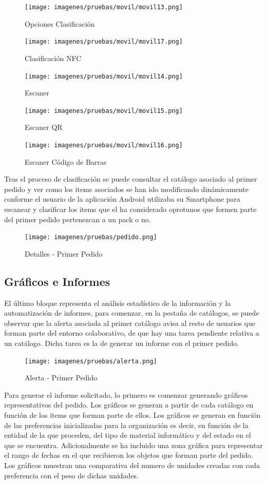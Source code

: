 \documentclass[a4paper,11pt]{book}
\begin{document}
\begin{figure}[H]
  \texttt{[image: imagenes/pruebas/movil/movil13.png]}
  \caption{Opciones Clasificación}
\endminipage\hfill
{}
  \texttt{[image: imagenes/pruebas/movil/movil17.png]}
  \caption{Clasificación NFC}
\endminipage\hfill
\end{figure}

\begin{figure}[H]
  \texttt{[image: imagenes/pruebas/movil/movil14.png]}
  \caption{Escaner}
\endminipage\hfill
{}
  \texttt{[image: imagenes/pruebas/movil/movil15.png]}
  \caption{Escaner QR}
\endminipage\hfill
{}
  \texttt{[image: imagenes/pruebas/movil/movil16.png]}
  \caption{Escaner Código de Barras}
\endminipage\hfill
\end{figure}

Tras el proceso de clasificación se puede consultar el catálogo asociado al primer pedido y ver como los items asociados se han ido modificando dinámicamente conforme el usuario de la aplicación Android utilizaba su Smartphone para escanear y clasificar los items que el ha considerado oprotunos que formen parte del primer pedido pertenezcan a un pack o no. 

\begin{figure}[H] 
\centering 
\texttt{[image: imagenes/pruebas/pedido.png]}
\caption{ Detalles - Primer Pedido}
\end{figure}

\subsection{ Gráficos e Informes}

El último bloque representa el análisis estadístico de la información y la automatización de informes, para comenzar, en la pestaña de catálogos, se puede observar que la alerta asociada al primer catálogo avisa al resto de usuarios que forman parte del entorno colaborativo, de que hay una tarea pendiente relativa a un catálogo. Dicha tarea es la de generar un informe con el primer pedido.

\begin{figure}[H] 
\centering 
\texttt{[image: imagenes/pruebas/alerta.png]}
\caption{ Alerta - Primer Pedido}
\end{figure}

Para generar el informe solicitado, lo primero es comenzar generando gráficos representativos del pedido. Los gráficos se generan a partir de cada catálogo en función de los items que forman parte de ellos. Los gráficos se generan en función de las preferencias inicializadas para la organización es decir, en función de la entidad de la que proceden, del tipo de material informático y del estado en el que se encuentra. Adicionalmente se ha incluido una zona gráfica para representar el rango de fechas en el que recibieron los objetos que forman parte del pedido. Los gráficos muestran una comparativa del numero de unidades creadas con cada preferencia con el peso de dichas unidades. 
\end{document}
